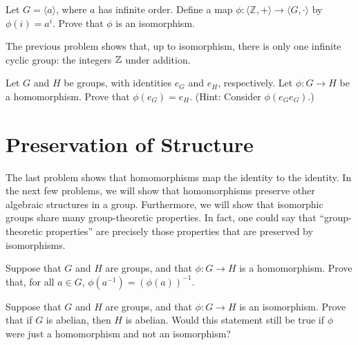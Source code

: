 \begin{problem}\label{prob:infcyciso}
Let \(G = \langle a \rangle\), where \(a\) has infinite order. Define a map \(\phi : \langle \mathbb{Z} , + \rangle \longrightarrow \langle G, \cdot \rangle \) by \(\phi(i) = a^i\). Prove that \(\phi\) is an isomorphism.
\end{problem}

The previous problem shows that, up to isomorphism, there is only one infinite cyclic group: the integers $\mathbb{Z}$ under addition.
\begin{annotation}
\end{annotation}

\begin{problem}
Let \(G\) and \(H\) be groups, with identities \(e_G\) and \(e_H\), respectively. Let \(\phi : G \longrightarrow H\) be a homomorphism. Prove that \(\phi(e_G) = e_H\). (Hint: Consider \(\phi(e_Ge_G)\).)
\end{problem}

\section{Preservation of Structure}

The last problem shows that homomorphisms map the identity to the identity. In the next few problems, we will show that homomorphisms preserve other algebraic structures in a group. Furthermore, we will show that isomorphic groups share many group-theoretic properties. In fact, one could say that ``group-theoretic properties'' are precisely those properties that are preserved by isomorphisms.

\begin{problem}
Suppose that \(G\) and \(H\) are groups, and that \(\phi : G \longrightarrow H \) is a homomorphism. Prove that, for all \( a \in G\), \(\phi(a^{-1}) = (\phi(a))^{-1} \).
\end{problem}

\begin{problem}
Suppose that \(G\) and \(H\) are groups, and that \(\phi : G \longrightarrow H \) is an isomorphism. Prove that if \(G\) is abelian, then \(H\) is abelian. Would this statement still be true if \(\phi\) were just a homomorphism and not an isomorphism?
\end{problem}


